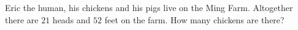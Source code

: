 Eric the human, his chickens and his pigs live on the Ming Farm. Altogether there are $21$ heads and $52$ feet on the farm. How many chickens are there?
